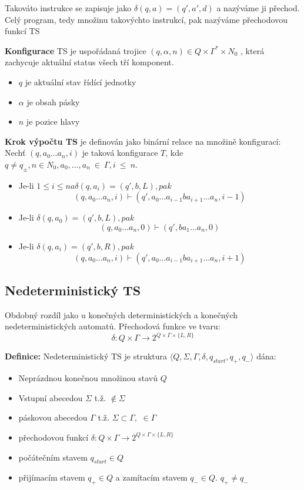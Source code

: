 \documentclass[10pt,a4paper]{article}
\theoremstyle{note}
\begin{document}
		Takováto instrukce se zapisuje jako $\delta (q,a) = (q', a', d)$ a nazýváme ji přechod. Celý program, tedy množinu 				takovýchto instrukcí, pak nazýváme přechodovou funkcí TS

		\textbf{Konfigurace} TS je uspořádaná trojice $(q, \alpha, n) \in Q \times \Gamma^{*} \times N_{0}$ , která zachycuje
		aktuální status všech tří komponent.
		\begin{itemize}
			\item $q$ je aktuální stav řídící jednotky
			\item $\alpha$ je obsah pásky
			\item $n$ je pozice hlavy
		\end{itemize}

		\textbf{Krok výpočtu TS} je definován jako binární relace na množině konfigurací: Nechť $(q,a_{0} \dots a_{n}, i) $
		je taková konfigurace $T$, kde $q \neq q_{\pm}, n \in N_{0}, a_{0}, \dots, a_{n}~\in~\Gamma, i~\leq~n. $
		\begin{itemize}
			\item Je-li $1 \leq i \leq n a \delta(q,a_{i}) = (q', b, L), pak$
				$$(q,a_{0} \dots a_{n}, i) \vdash (q', a_{0} \dots a_{i-1}ba_{i+1} \dots a_{n}, i-1) $$
			\item Je-li $\delta(q,a_{0}) = (q', b, L), pak$
				$$(q,a_{0} \dots a_{n}, 0) \vdash (q', ba_{1} \dots a_{n}, 0) $$
			\item Je-li $\delta(q,a_{i}) = (q', b, R), pak$
				$$(q,a_{0} \dots a_{n}, i) \vdash (q', a_{0} \dots a_{i-1}ba_{i+1} \dots a_{n}, i+1) $$
		\end{itemize}



	\subsection{Nedeterministický TS}

		Obdobný rozdíl jako u konečných deterministických a konečných nedeterministických automatů. Přechodová funkce ve 				tvaru:
		$$\delta : Q \times  \Gamma \rightarrow 2^{Q \times \Gamma \times \{L , R \}}$$

		\textbf{Definice: }
		Nedeterministický TS je struktura $\langle Q, \Sigma, \Gamma, \delta, q_{start}, q_{+}, q_{-} \rangle $ dána:
		\begin{itemize}
			\item Neprázdnou konečnou množinou stavů $Q$
			\item Vstupní abecedou  $\Sigma$ t.ž. \textvisiblespace $ \notin \Sigma$
			\item páskovou abecedou $\Gamma$ t.ž. $\Sigma \subset \Gamma,$ \textvisiblespace $\in  \Gamma $
			\item přechodovou funkcí $\delta : Q \times  \Gamma \rightarrow 2^{Q \times \Gamma \times \{L , R \}} $
			\item počátečním stavem $q_{start} \in Q$
			\item přijímacím stavem $q_{+} \in Q $ a zamítacím stavem $q_{-} \in Q.$ $q_{+} \neq q_{-}$
		\end{itemize}
\end{document}

